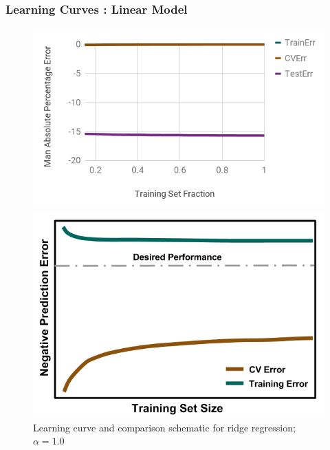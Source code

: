 
\begin{frame}
  \frametitle{Learning Curves : Linear Model}
  \begin{figure}
    \begin{minipage}{0.65\textwidth}
      \centering
      \includegraphics[width=\linewidth]{./figures/rr-learn.png}
    \end{minipage}%
    \begin{minipage}{0.35\textwidth}
      \centering
      \includegraphics[width=\linewidth]{./figures/NegLearningCurve-variance.png}
    \end{minipage}
    \caption{Learning curve and comparison schematic for ridge regression; $\alpha=1.0$}
  \end{figure}
\end{frame}

